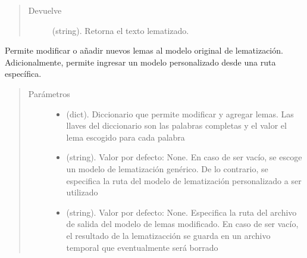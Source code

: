 \documentclass[letterpaper,10pt,openany,spanish]{sphinxmanual}
\begin{document}
\begin{fulllineitems}
\begin{fulllineitems}
\begin{quote}
\begin{description}
\item[{Devuelve}] \leavevmode
(string). Retorna el texto lematizado.

\end{description}\end{quote}

\end{fulllineitems}


\begin{fulllineitems}
\label{\detokenize{funciones/lematizacion:lematizacion.LematizadorStanza.modificar_lemmas}}
Permite modificar o añadir nuevos lemas al modelo original de             lematización. Adicionalmente, permite ingresar un modelo personalizado             desde una ruta específica.
\begin{quote}\begin{description}
\item[{Parámetros}] \leavevmode\begin{itemize}
\item {} 
 \textendash{} (dict). Diccionario que permite modificar y agregar             lemas. Las llaves del diccionario son las palabras completas             y el valor el lema escogido para cada palabra

\item {} 
 \textendash{} (string). Valor por defecto: None. En caso de             ser vacío, se escoge un modelo de lematización genérico. De lo contrario,             se especifica la ruta del modelo de lematización personalizado a ser             utilizado

\item {} 
 \textendash{} (string). Valor por defecto: None. Especifica la ruta             del archivo de salida del modelo de lemas modificado. En caso de ser             vacío, el resultado de la lematizacción se guarda en un archivo             temporal que eventualmente será borrado


\end{itemize}
\end{description}
\end{quote}
\end{fulllineitems}
\end{fulllineitems}
\end{document}

